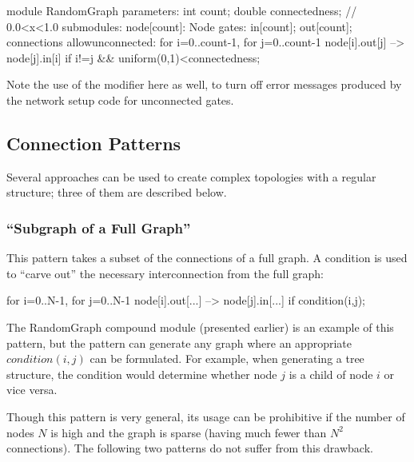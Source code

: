\begin{ned}
module RandomGraph {
    parameters:
        int count;
        double connectedness; // 0.0<x<1.0
    submodules:
        node[count]: Node {
            gates:
                in[count];
                out[count];
        }
    connections allowunconnected:
        for i=0..count-1, for j=0..count-1 {
            node[i].out[j] --> node[j].in[i]
                if i!=j && uniform(0,1)<connectedness;
        }
}
\end{ned}

Note the use of the  modifier
here as well, to turn off error messages produced by the network setup code
for unconnected gates.


\subsection{Connection Patterns}
\label{sec:ned-lang:connection-design-patterns}


Several approaches can be used to create complex topologies with a
regular structure; three of them are described below.


\subsubsection{``Subgraph of a Full Graph''}
\label{sec:ned-lang:subgraph-of-full-graph}


This pattern takes a subset of the connections of a full graph.  A
condition is used to ``carve out'' the necessary interconnection from
the full graph:

\begin{ned}
for i=0..N-1, for j=0..N-1 {
    node[i].out[...] --> node[j].in[...] if condition(i,j);
}
\end{ned}

The RandomGraph compound module (presented earlier) is an example of
this pattern, but the pattern can generate any graph where an
appropriate $condition(i,j)$ can be formulated. For example,
when generating a tree structure, the condition
would determine whether node $j$ is a child of node $i$ or
vice versa.

Though this pattern is very general, its usage can be prohibitive if
the number of nodes $N$ is high and the graph is sparse (having
much fewer than $N^2$ connections). The following
two patterns do not suffer from this drawback.


